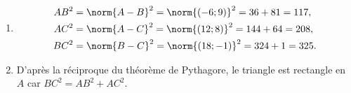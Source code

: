 {\begin{center}
	\end{center}
	
	\begin{enumerate}
		\item%
			\begin{align*}
				AB^2 &= \norm{A-B}^2 = \norm{(-6 ; 9)}^2 = 36 + 81 = 117, \\
				AC^2 &= \norm{A-C}^2 = \norm{(12 ; 8)}^2 = 144 + 64 = 208, \\
				BC^2 &= \norm{B-C}^2 = \norm{(18 ; -1)}^2 = 324 + 1 = 325.
			\end{align*}
		\item%
		D'après la réciproque du théorème de Pythagore, le triangle est rectangle en $A$ car $BC^2 = AB^2 + AC^2$.
	\end{enumerate}
}